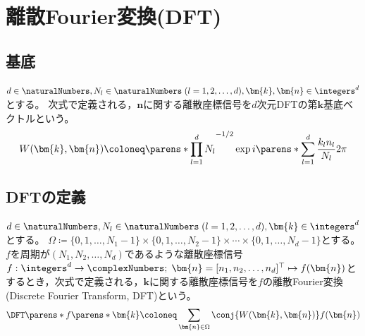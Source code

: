 \chapter{離散Fourier変換(DFT)}
    \section{基底}
        $d\in\naturalNumbers,N_l\in\naturalNumbers\;(l=1,2,\dots,d),\bm{k},\bm{n}\in\integers^d$とする。
        次式で定義される，$\bm{n}$に関する離散座標信号を$d$次元DFTの第$\bm{k}$基底ベクトルという。
        \[ W(\bm{k},\bm{n}) \coloneq \parens*{\prod_{l=1}^d N_l}^{-1/2} \exp i\parens*{\sum_{l=1}^d \frac{k_l n_l}{N_l}2\pi}\]

    \section{DFTの定義}
        \label{DFTの定義}
        $d\in\naturalNumbers,N_l\in\naturalNumbers\;(l=1,2,\dots,d),\bm{k}\in\integers^d$とする。
        $\Omega \coloneq \{0,1,\dots,N_1-1\}\times\{0,1,\dots,N_2-1\}\times\cdots\times\{0,1,\dots,N_d-1\}$とする。
        $f$を周期が$(N_1,N_2,\dots,N_d)$であるような離散座標信号$f: \integers^d\to\complexNumbers;\;\bm{n} = [n_1,n_2,\dots,n_d]^\top \mapsto f(\bm{n})$とするとき，次式で定義される，$\bm{k}$に関する離散座標信号を$f$の離散Fourier変換(Discrete Fourier Transform, DFT)という。
        \[ \DFT\parens*{f}\parens*{\bm{k}} \coloneq \sum_{\bm{n}\in\Omega} \conj{W(\bm{k},\bm{n})} f(\bm{n}) \]

